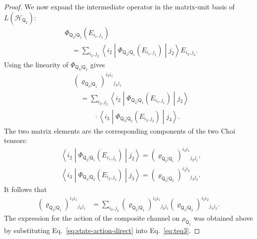 \documentclass[
    aps,
    pra,
    reprint,
    superscriptaddress,
    nofootinbib
]{revtex4-2}
\theoremstyle{definition}
\theoremstyle{plain}
\begin{document}
\begin{proof}
    We now expand the intermediate operator in the matrix-unit basis of
    $L(\mathcal{H}_{\mathsf{Q}_{2}})$:
    \begin{equation}
        \begin{aligned}
        &\Phi_{\mathsf{Q}_{2}|\mathsf{Q}_{1}}
        (E_{i_{1},j_{1}})\\
        &\quad=
        \sum_{i_{2},j_{2}}
        \left\langle i_{2}\middle|
            \Phi_{\mathsf{Q}_{2}|\mathsf{Q}_{1}}
            (E_{i_{1},j_{1}})
        \middle|j_{2}\right\rangle
        E_{i_{2},j_{2}}.
        \end{aligned}
    \end{equation}
    Using the linearity of
    $\Phi_{\mathsf{Q}_{3}|\mathsf{Q}_{2}}$ gives
    \begin{align}
        &\left(
            \varrho_{\mathsf{Q}_{3}|\mathsf{Q}_{1}}
        \right)^{i_{3}i_{1}}{}_{j_{3}j_{1}}
        \nonumber\\
        &\quad=
        \sum_{i_{2},j_{2}}
        \left\langle i_{2}\middle|
            \Phi_{\mathsf{Q}_{2}|\mathsf{Q}_{1}}
            (E_{i_{1},j_{1}})
        \middle|j_{2}\right\rangle
        \nonumber\\
        &\qquad\quad\cdot
        \left\langle i_{3}\middle|
            \Phi_{\mathsf{Q}_{3}|\mathsf{Q}_{2}}
            (E_{i_{2},j_{2}})
        \middle|j_{3}\right\rangle.
    \end{align}
    The two matrix elements are the corresponding components of the
    two Choi tensors:
    \begin{align}
        &\left\langle i_{2}\middle|
            \Phi_{\mathsf{Q}_{2}|\mathsf{Q}_{1}}
            (E_{i_{1},j_{1}})
        \middle|j_{2}\right\rangle
        =
        \left(
            \varrho_{\mathsf{Q}_{2}|\mathsf{Q}_{1}}
        \right)^{i_{2}i_{1}}{}_{j_{2}j_{1}},\\
        &\left\langle i_{3}\middle|
            \Phi_{\mathsf{Q}_{3}|\mathsf{Q}_{2}}
            (E_{i_{2},j_{2}})
        \middle|j_{3}\right\rangle
        =
        \left(
            \varrho_{\mathsf{Q}_{3}|\mathsf{Q}_{2}}
        \right)^{i_{3}i_{2}}{}_{j_{3}j_{2}}.
    \end{align}
    It follows that
    \begin{equation}
        \begin{aligned}
        \left(
            \varrho_{\mathsf{Q}_{3}|\mathsf{Q}_{1}}
        \right)^{i_{3}i_{1}}{}_{j_{3}j_{1}}
        &=
        \sum_{i_{2},j_{2}}
        \left(
            \varrho_{\mathsf{Q}_{2}|\mathsf{Q}_{1}}
        \right)^{i_{2}i_{1}}{}_{j_{2}j_{1}}
        \left(
            \varrho_{\mathsf{Q}_{3}|\mathsf{Q}_{2}}
        \right)^{i_{3}i_{2}}{}_{j_{3}j_{2}}.
        \end{aligned}
    \end{equation}
    The expression for the action of the composite channel on
    $\rho_{\mathsf{Q}_{1}}$ was obtained above by substituting
    Eq.~\eqref{eq:state-action-direct} into Eq.~\eqref{eq:teq3}.
\end{proof}
\end{document}
